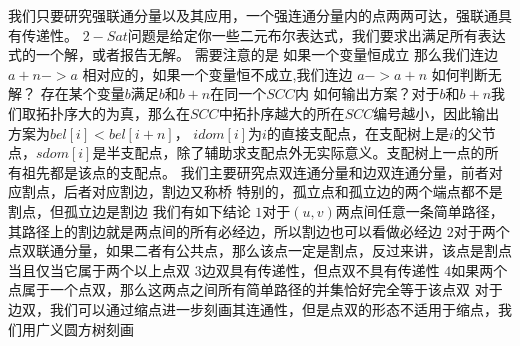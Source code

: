 \markdownRendererInterblockSeparator
{}我们只要研究强联通分量以及其应用，一个强连通分量内的点两两可达，强联通具有传递性。\markdownRendererInterblockSeparator
{}\markdownRendererSectionBegin
{}\markdownRendererInterblockSeparator
{}\markdownRendererInterblockSeparator
{}
\markdownRendererSectionEnd \markdownRendererSectionBegin
{}\markdownRendererInterblockSeparator
{}$ 2-Sat $问题是给定你一些二元布尔表达式，我们要求出满足所有表达式的一个解，或者报告无解。\markdownRendererParagraphSeparator
{}需要注意的是 如果一个变量恒成立 那么我们连边$ a+n->a $\markdownRendererParagraphSeparator
{}相对应的，如果一个变量恒不成立,我们连边 $ a->a+n $\markdownRendererParagraphSeparator
{}如何判断无解？ 存在某个变量$ b $满足$ b $和$ b+n $在同一个$ SCC $内\markdownRendererParagraphSeparator
{}如何输出方案？对于$ b $和$ b+n $我们取拓扑序大的为真，那么在$ SCC $中拓扑序越大的所在$ SCC $编号越小，因此输出方案为$ bel[i]<bel[i+n] $，\markdownRendererInterblockSeparator
{}
\markdownRendererSectionEnd \markdownRendererSectionBegin
{}\markdownRendererInterblockSeparator
{}$ idom[i] $为$ i $的直接支配点，在支配树上是$ i $的父节点，$ sdom[i] $是半支配点，除了辅助求支配点外无实际意义。支配树上一点的所有祖先都是该点的支配点。\markdownRendererInterblockSeparator
{}\markdownRendererInterblockSeparator
{}
\markdownRendererSectionEnd 
\markdownRendererSectionEnd \markdownRendererSectionBegin
{}\markdownRendererInterblockSeparator
{}我们主要研究点双连通分量和边双连通分量，前者对应割点，后者对应割边，割边又称桥\markdownRendererParagraphSeparator
{}特别的，孤立点和孤立边的两个端点都不是割点，但孤立边是割边\markdownRendererParagraphSeparator
{}我们有如下结论\markdownRendererParagraphSeparator
{}$ 1 $对于$ (u,v) $两点间任意一条简单路径，其路径上的割边就是两点间的所有必经边，所以割边也可以看做必经边\markdownRendererParagraphSeparator
{}$ 2 $对于两个点双联通分量，如果二者有公共点，那么该点一定是割点，反过来讲，该点是割点当且仅当它属于两个以上点双\markdownRendererParagraphSeparator
{}$ 3 $边双具有传递性，但点双不具有传递性\markdownRendererParagraphSeparator
{}$ 4 $如果两个点属于一个点双，那么这两点之间所有简单路径的并集恰好完全等于该点双\markdownRendererParagraphSeparator
{}对于边双，我们可以通过缩点进一步刻画其连通性，但是点双的形态不适用于缩点，我们用广义圆方树刻画\markdownRendererInterblockSeparator
